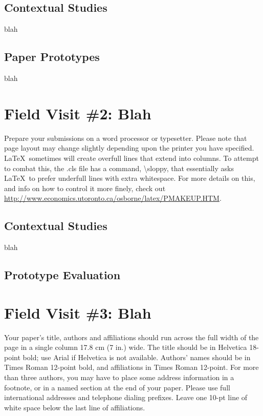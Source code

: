 \documentclass{sigchi}
\begin{document}
\subsection{Contextual Studies}
blah

\subsection{Paper Prototypes}
blah

\section{Field Visit \#2: Blah}

Prepare your submissions on a word processor or typesetter.  Please
note that page layout may change slightly depending upon the printer
you have specified.  \LaTeX\ sometimes will create overfull lines
that extend into columns.  To attempt to combat this, the .cls
file has a command, {\textbackslash}sloppy, that essentially asks
\LaTeX\ to prefer underfull lines with extra whitespace.  For more
details on this, and info on how to control it more finely, check out
{\url{http://www.economics.utoronto.ca/osborne/latex/PMAKEUP.HTM}}.

\subsection{Contextual Studies}
blah

\subsection{Prototype Evaluation}

\section{Field Visit \#3: Blah}

Your paper's title, authors and affiliations should run across the
full width of the page in a single column 17.8 cm (7 in.) wide.  The
title should be in Helvetica 18-point bold; use Arial if Helvetica is
not available.  Authors' names should be in Times Roman 12-point bold,
and affiliations in Times Roman 12-point.  For more than three authors,
you may have to place some address information in a footnote, or in a named
section at the end of your paper. Please use full international addresses and
telephone dialing prefixes.  Leave one 10-pt line of white space below the last
line of affiliations.
\end{document}
